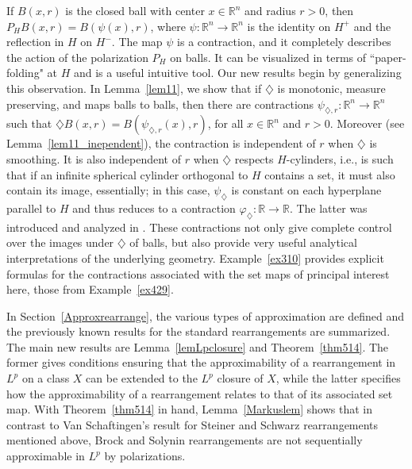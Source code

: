 \documentclass[12pt,reqno]{amsart}
\newcommand{\R}{{\mathbb R}}
\newcommand{\di}{\diamondsuit}
\numberwithin{equation}{section}
\begin{document}
If $B(x,r)$ is the closed ball with center $x\in \R^n$ and radius $r>0$, then $P_HB(x,r)=B(\psi(x),r)$, where $\psi:\R^n\to \R^n$ is the identity on $H^+$ and the reflection in $H$ on $H^-$. The map $\psi$ is a contraction, and it completely describes the action of the polarization $P_H$ on balls. It can be visualized in terms of ``paper-folding" at $H$ and is a useful intuitive tool. Our new results begin by generalizing this observation. In Lemma~\ref{lem11}, we show that if $\di$ is monotonic, measure preserving, and maps balls to balls, then there are contractions $\psi_{\di,r}:\R^n\to \R^n$ such that $\di B(x,r)=B(\psi_{\di,r}(x),r)$, for all  $x\in \R^n$ and $r>0$.  Moreover (see Lemma~\ref{lem11_inependent}), the contraction is independent of $r$ when $\di$ is smoothing. It is also independent of $r$ when $\di$  respects $H$-cylinders, i.e., is such that if an infinite spherical cylinder orthogonal to $H$ contains a set, it must also contain its image, essentially; in this case, $\psi_\di$ is constant on each hyperplane parallel to $H$ and thus reduces to a contraction $\varphi_\di:\R\to\R$. The latter was introduced and analyzed in \cite[Lemma~6.2]{BGGK1}.  These contractions not only give complete control over the images under $\di$ of balls, but also provide very useful analytical interpretations of the underlying geometry. Example~\ref{ex310} provides explicit formulas for the contractions associated with the set maps of principal interest here, those from Example~\ref{ex429}.

In Section~\ref{Approxrearrange}, the various types of approximation are defined and the previously known results for the standard rearrangements are summarized.  The main new results are Lemma~\ref{lemLpclosure} and Theorem~\ref{thm514}. The former gives conditions ensuring that the approximability of a rearrangement in $L^p$ on a class $X$ can be extended to the $L^p$ closure of $X$, while the latter specifies how the approximability of a rearrangement relates to that of its associated set map. With Theorem~\ref{thm514} in hand,  Lemma~\ref{Markuslem} shows that in contrast to Van Schaftingen's result for Steiner and Schwarz rearrangements mentioned above, Brock and Solynin rearrangements are not sequentially approximable in $L^p$ by polarizations.
\end{document}
